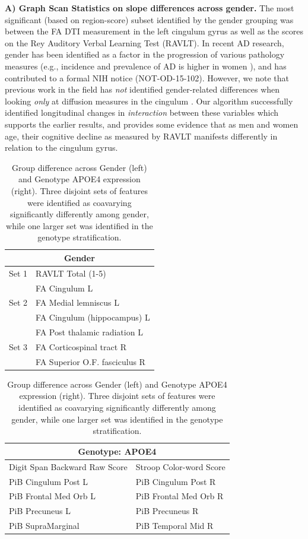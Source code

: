 {\bf A) Graph Scan Statistics on slope differences across gender.} 
The most significant (based on region-score) subset identified by the gender grouping was between the FA DTI measurement in the left cingulum gyrus 
as well as the scores on the Rey Auditory Verbal Learning Test (RAVLT). In recent AD research, gender has been identified as a factor in the progression 
of various pathology measures (e.g., incidence and prevalence of AD is higher in women \cite{fratiglioni1991prevalence,rimol2010sex}), and has contributed to a formal NIH notice (NOT-OD-15-102). However, we note that previous work in the field has \textit{not} identified gender-related 
differences when looking {\em only} at diffusion measures in the cingulum \cite{lin2014cingulum}. Our algorithm 
successfully identified longitudinal 
changes in {\em interaction} between these variables which supports the earlier results, and provides some evidence that as men and women age, 
their cognitive decline as measured by RAVLT manifests differently in relation to the cingulum gyrus.
%

\begin{table}
	\scriptsize
	\centering
	\begin{tabular}[t]{ll}
		\toprule
		\multicolumn{2}{c}{\textbf{Gender}}\\ \midrule \midrule
		
		Set 1     & RAVLT Total (1-5) \\ & FA Cingulum  L	\\
		\midrule
		Set 2 & FA Medial lemniscus L	\\ & FA Cingulum (hippocampus) L		\\
		& FA Post thalamic radiation L \\ \midrule
		Set 3    & FA Corticospinal tract R \\ & FA Superior O.F. fasciculus  R \\	\midrule\bottomrule
	\end{tabular}
	\hfill
	\begin{tabular}[t]{ll}
		\toprule
		\multicolumn{2}{c}{\textbf{Genotype: APOE4}}\\ \midrule \midrule
		Digit Span Backward Raw Score & Stroop Color-word Score \\ 
		PiB Cingulum Post L &    PiB Cingulum Post R         \\
		PiB Frontal Med Orb L & 		PiB Frontal Med Orb R \\ 
		PiB Precuneus L & PiB Precuneus R \\ 
		PiB SupraMarginal &  PiB Temporal Mid R \\ \midrule		 \bottomrule
	\end{tabular}
	\caption[Group differences identified across gender and genotype]{\label{tab:wrapIMG}Group difference across Gender (left) and Genotype APOE4 expression (right). Three disjoint sets of features were identified as coavarying significantly differently among gender, while one larger set was identified in the genotype stratification.}
\end{table}


